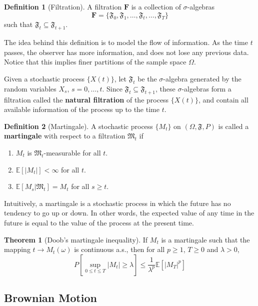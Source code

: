 \documentclass[12pt,a4paper]{article}
\theoremstyle{definition}
\newtheorem{theorem}{Theorem}[section]
\newtheorem{definition}{Definition}[section]
\begin{document}
\begin{definition}[Filtration]
	A filtration $\textbf{F}$ is a collection of $\sigma$-algebras
	\[
		\textbf{F} = \{ \mathfrak{F}_0, \mathfrak{F}_1, \ldots, \mathfrak{F}_t, \ldots, \mathfrak{F}_T \}
	\]
	such that $\mathfrak{F}_t \subseteq \mathfrak{F}_{t+1}$.
\end{definition}

The idea behind this definition is to model the flow of information. As the time $t$ passes, the observer has more information, and does not lose any previous data. Notice that this implies finer partitions of the sample space $\Omega$.

Given a stochastic process $\{ X(t) \}$, let $\mathfrak{F}_t$ be the $\sigma$-algebra generated by the random variables $X_s$, $s = 0, \ldots, t$. Since $\mathfrak{F}_t \subseteq \mathfrak{F}_{t+1}$, these $\sigma$-algebras form a filtration called the \textbf{natural filtration} of the process $\{ X(t) \}$, and contain all available information of the process up to the time $t$.

\begin{definition}[Martingale]
	A stochastic process $\{M_t \}$ on $(\Omega, \mathfrak{F}, P)$ is called a \textbf{martingale} with respect to a filtration $\mathfrak{M}_t$ if 
	\begin{enumerate}
		\item $M_t$ is $\mathfrak{M}_t$-measurable for all $t$.
		\item $\mathbb{E}[|M_t|] < \infty$ for all $t$.
		\item $\mathbb{E}[M_s | \mathfrak{M}_t] = M_t$ for all $s \geq t$.
	\end{enumerate}
\end{definition}

Intuitively, a martingale is a stochastic process in which the future has no tendency to go up or down. In other words, the expected value of any time in the future is equal to the value of the process at the present time.

\begin{theorem}[Doob's martingale inequality]
	If $M_t$ is a martingale such that the mapping $t \longrightarrow M_t(\omega)$ is continuous a.s., then for all $p \geq 1$, $T \geq 0$ and $\lambda > 0$,
	\[
		P \left[ \sup_{0 \leq t \leq T} |M_t| \geq \lambda \right] \leq \frac{1}{\lambda^p} \mathbb{E} [|M_T|^p]
	\]
\end{theorem}

\subsection{Brownian Motion}
\end{document}
